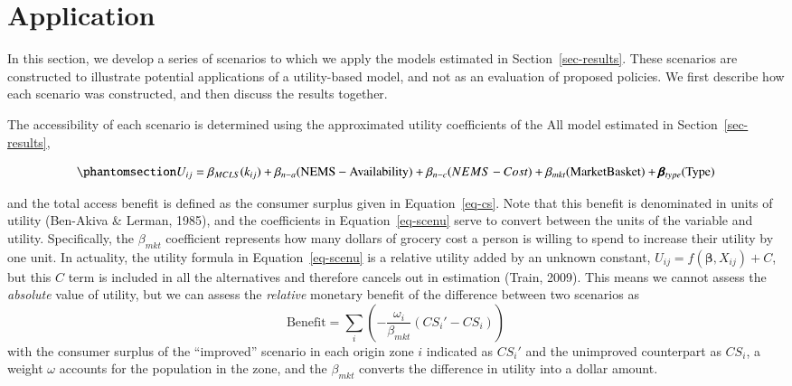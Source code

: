 \documentclass[
  letterpaper,
  number,
  review,
  3p]{elsarticle}
\begin{document}

\section{Application}\label{sec-scenarios}

In this section, we develop a series of scenarios to which we apply the
models estimated in Section~\ref{sec-results}. These scenarios are
constructed to illustrate potential applications of a utility-based
model, and not as an evaluation of proposed policies. We first describe
how each scenario was constructed, and then discuss the results
together.

The accessibility of each scenario is determined using the approximated
utility coefficients of the All model estimated in
Section~\ref{sec-results},

\begin{equation}\phantomsection\label{eq-scenu}{
U_{ij}= \beta_{MCLS}( k_{ij}) +  \beta_{n-a} (\mathrm{NEMS-Availability}) +
  \beta_{n-c}\mathrm({NEMS-Cost}) + \\ \beta_{mkt} (\mathrm{Market Basket}) + \pmb{\beta}_{type}(\mathrm{Type})  
}\end{equation}

and the total access benefit is defined as the consumer surplus given in
Equation~\ref{eq-cs}. Note that this benefit is denominated in units of
utility (Ben-Akiva \& Lerman, 1985), and the coefficients in
Equation~\ref{eq-scenu} serve to convert between the units of the
variable and utility. Specifically, the \(\beta_{mkt}\) coefficient
represents how many dollars of grocery cost a person is willing to spend
to increase their utility by one unit. In actuality, the utility formula
in Equation~\ref{eq-scenu} is a relative utility added by an unknown
constant, \(U_{ij} = f(\mathbf{\beta}, X_{ij}) + C\), but this \(C\)
term is included in all the alternatives and therefore cancels out in
estimation (Train, 2009). This means we cannot assess the
\emph{absolute} value of utility, but we can assess the \emph{relative}
monetary benefit of the difference between two scenarios as \[
\mathrm{Benefit} = \sum_{i}\left(-\frac{\omega_i}{\beta_{mkt}}(CS_i' - CS_i)\right)
\] with the consumer surplus of the ``improved'' scenario in each origin
zone \(i\) indicated as \(CS_i'\) and the unimproved counterpart as
\(CS_i\), a weight \(\omega\) accounts for the population in the zone,
and the \(\beta_{mkt}\) converts the difference in utility into a dollar
amount.
\end{document}
